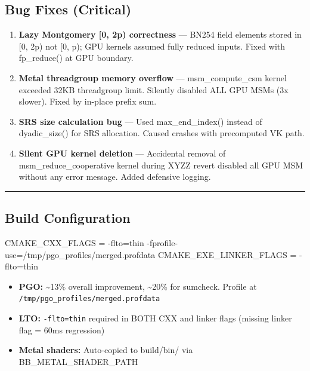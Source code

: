 \documentclass[
]{article}
\newenvironment{Shaded}{}{}
\newcommand{\FunctionTok}[1]{\textcolor[rgb]{0.02,0.16,0.49}{#1}}
\providecommand{\tightlist}{%
  \setlength{\itemsep}{0pt}\setlength{\parskip}{0pt}}
\begin{document}
\subsection{Bug Fixes (Critical)}\label{bug-fixes-critical}

\begin{enumerate}
\def\labelenumi{\arabic{enumi}.}
\item
  \textbf{Lazy Montgomery {[}0, 2p) correctness} --- BN254 field
  elements stored in {[}0, 2p) not {[}0, p); GPU kernels assumed fully
  reduced inputs. Fixed with fp\_reduce() at GPU boundary.
\item
  \textbf{Metal threadgroup memory overflow} --- msm\_compute\_csm
  kernel exceeded 32KB threadgroup limit. Silently disabled ALL GPU MSMs
  (3x slower). Fixed by in-place prefix sum.
\item
  \textbf{SRS size calculation bug} --- Used max\_end\_index() instead
  of dyadic\_size() for SRS allocation. Caused crashes with precomputed
  VK path.
\item
  \textbf{Silent GPU kernel deletion} --- Accidental removal of
  msm\_reduce\_cooperative kernel during XYZZ revert disabled all GPU
  MSM without any error message. Added defensive logging.
\end{enumerate}

\begin{center}\rule{0.5\linewidth}{0.5pt}\end{center}

\subsection{Build Configuration}\label{build-configuration}

\begin{Shaded}
\begin{Highlighting}[]
\FunctionTok{CMAKE\_CXX\_FLAGS = {-}flto=thin {-}fprofile{-}use=/tmp/pgo\_profiles/merged.profdata}
\FunctionTok{CMAKE\_EXE\_LINKER\_FLAGS = {-}flto=thin}
\end{Highlighting}
\end{Shaded}

\begin{itemize}
\tightlist
\item
  \textbf{PGO:} \textasciitilde13\% overall improvement,
  \textasciitilde20\% for sumcheck. Profile at
  \texttt{/tmp/pgo\_profiles/merged.profdata}
\item
  \textbf{LTO:} \texttt{-flto=thin} required in BOTH CXX and linker
  flags (missing linker flag = 60ms regression)
\item
  \textbf{Metal shaders:} Auto-copied to build/bin/ via
  BB\_METAL\_SHADER\_PATH
\end{itemize}
\end{document}
